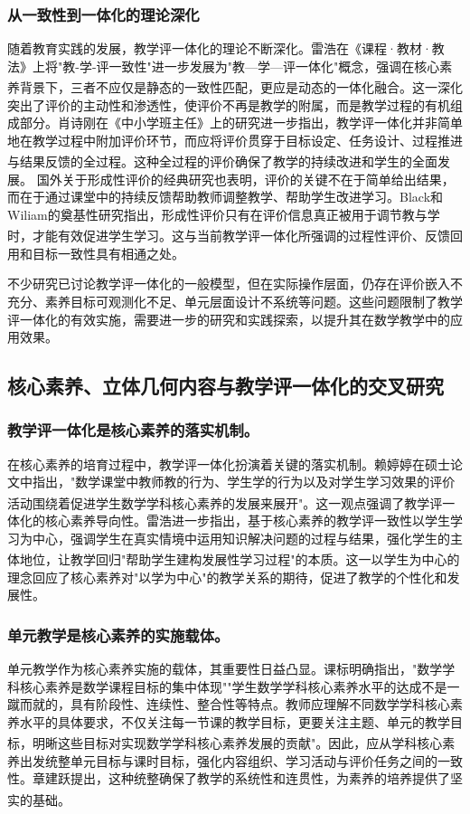 \documentclass[UTF8,a4paper,12pt,twoside]{ctexart}
\begin{document}
\subsubsection{从一致性到一体化的理论深化}
随着教育实践的发展，教学评一体化的理论不断深化。雷浩在《课程·教材·教法》上将"教-学-评一致性"进一步发展为"教—学—评一体化"概念，强调在核心素养背景下，三者不应仅是静态的一致性匹配，更应是动态的一体化融合\textsuperscript{\cite{lei2023}}。这一深化突出了评价的主动性和渗透性，使评价不再是教学的附属，而是教学过程的有机组成部分。肖诗刚在《中小学班主任》上的研究进一步指出，教学评一体化并非简单地在教学过程中附加评价环节，而应将评价贯穿于目标设定、任务设计、过程推进与结果反馈的全过程\textsuperscript{\cite{xiao2025}}。这种全过程的评价确保了教学的持续改进和学生的全面发展。
国外关于形成性评价的经典研究也表明，评价的关键不在于简单给出结果，而在于通过课堂中的持续反馈帮助教师调整教学、帮助学生改进学习。Black和Wiliam的奠基性研究指出，形成性评价只有在评价信息真正被用于调节教与学时，才能有效促进学生学习\textsuperscript{\cite{Black}}。这与当前教学评一体化所强调的过程性评价、反馈回用和目标一致性具有相通之处。

不少研究已讨论教学评一体化的一般模型，但在实际操作层面，仍存在评价嵌入不充分、素养目标可观测化不足、单元层面设计不系统等问题。这些问题限制了教学评一体化的有效实施，需要进一步的研究和实践探索，以提升其在数学教学中的应用效果。

\subsection{核心素养、立体几何内容与教学评一体化的交叉研究}

\subsubsection{教学评一体化是核心素养的落实机制。}
在核心素养的培育过程中，教学评一体化扮演着关键的落实机制。赖婷婷在硕士论文中指出，"数学课堂中教师教的行为、学生学的行为以及对学生学习效果的评价活动围绕着促进学生数学学科核心素养的发展来展开"\textsuperscript{\cite{lai2024}}。这一观点强调了教学评一体化的核心素养导向性。雷浩进一步指出，基于核心素养的教学评一致性以学生学习为中心，强调学生在真实情境中运用知识解决问题的过程与结果，强化学生的主体地位，让教学回归"帮助学生建构发展性学习过程"的本质\textsuperscript{\cite{lei2023}}。这一以学生为中心的理念回应了核心素养对"以学为中心"的教学关系的期待，促进了教学的个性化和发展性。

\subsubsection{单元教学是核心素养的实施载体。}
单元教学作为核心素养实施的载体，其重要性日益凸显。课标明确指出，"数学学科核心素养是数学课程目标的集中体现""学生数学学科核心素养水平的达成不是一蹴而就的，具有阶段性、连续性、整合性等特点。教师应理解不同数学学科核心素养水平的具体要求，不仅关注每一节课的教学目标，更要关注主题、单元的教学目标，明晰这些目标对实现数学学科核心素养发展的贡献"\textsuperscript{\cite{gaozhong_kebiao}}。因此，应从学科核心素养出发统整单元目标与课时目标，强化内容组织、学习活动与评价任务之间的一致性。章建跃提出，这种统整确保了教学的系统性和连贯性，为素养的培养提供了坚实的基础\textsuperscript{\cite{zhang2020}}。
\end{document}
